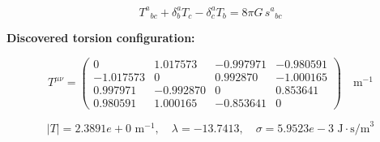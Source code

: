 
\begin{equation}
  T^a{}_{bc} + \delta^a_b T_c - \delta^a_c T_b = 8\pi G \, s^a{}_{bc}
\end{equation}

\textbf{Discovered torsion configuration:}

\begin{equation}
  T^{\mu\nu} = \begin{pmatrix}
    0 & 1.017573 & -0.997971 & -0.980591 \\
    -1.017573 & 0 & 0.992870 & -1.000165 \\
    0.997971 & -0.992870 & 0 & 0.853641 \\
    0.980591 & 1.000165 & -0.853641 & 0
  \end{pmatrix} \quad \text{m}^{-1}
\end{equation}

\begin{equation}
  |T| = 2.3891e+0 \text{ m}^{-1}, \quad
  \lambda = -13.7413, \quad
  \sigma = 5.9523e-3 \text{ J}\cdot\text{s/m}^3
\end{equation}